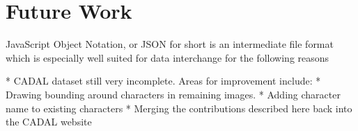 \chapter{Future Work}
JavaScript Object Notation, or JSON for short is an intermediate file format which is especially well suited for data interchange for the following reasons

* CADAL dataset still very incomplete.  Areas for improvement include:
    * Drawing bounding around characters in remaining images.
    * Adding character name to existing characters
    * Merging the contributions described here back into the CADAL website
    
